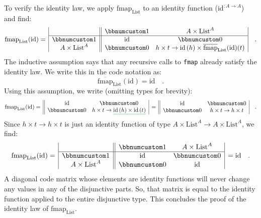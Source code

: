To verify the identity law, we apply $\text{fmap}_{\text{List}}$
to an identity function ($\text{id}^{:A\rightarrow A}$) and find:
\[
\text{fmap}_{\text{List}}(\text{id})=\,\begin{array}{|c||cc|}
 & \bbnum 1 & A\times\text{List}^{A}\\
\hline \bbnum 1 & \text{id} & \bbnum 0\\
A\times\text{List}^{A} & \bbnum 0 & h\times t\rightarrow\text{id}\,(h)\times\overline{\text{fmap}}_{\text{List}}(\text{id})(t)
\end{array}\quad.
\]
The inductive assumption says that any recursive calls to \lstinline!fmap!
already satisfy the identity law. We write this in the code notation
as:
\[
\overline{\text{fmap}}_{\text{List}}(\text{id})=\text{id}\quad.
\]
Using this assumption, we write (omitting types for brevity):
\[
\text{fmap}_{\text{List}}(\text{id})=\,\begin{array}{||cc|}
\text{id} & \bbnum 0\\
\bbnum 0 & h\times t\rightarrow\gunderline{\text{id}\,(h)\times\text{id}\,(t)}
\end{array}\,=\,\begin{array}{||cc|}
\text{id} & \bbnum 0\\
\bbnum 0 & h\times t\rightarrow h\times t
\end{array}\quad.
\]
Since $h\times t\rightarrow h\times t$ is just an identity function
of type $A\times\text{List}^{A}\rightarrow A\times\text{List}^{A}$,
we find:
\[
\text{fmap}_{\text{List}}(\text{id})=\,\begin{array}{|c||cc|}
 & \bbnum 1 & A\times\text{List}^{A}\\
\hline \bbnum 1 & \text{id} & \bbnum 0\\
A\times\text{List}^{A} & \bbnum 0 & \text{id}
\end{array}\,=\text{id}\quad.
\]
A diagonal code matrix whose elements are identity functions will
never change any values in any of the disjunctive parts. So, that
matrix is equal to the identity function applied to the entire disjunctive
type. This concludes the proof of the identity law of $\text{fmap}_{\text{List}}$.

